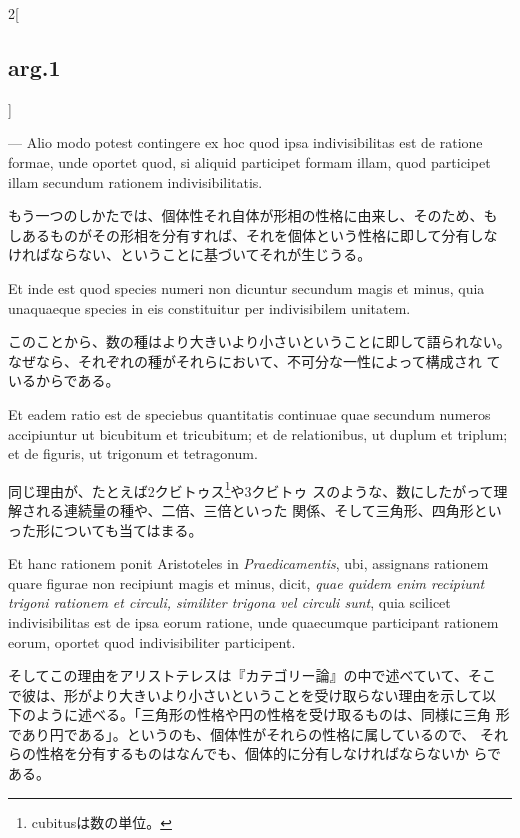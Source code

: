\documentclass[paper=a4paper,fontsize=10pt,jafontsize=9pt,titlepage]{jlreq}
\begin{document}
\begin{paracol}{2}[\subsection{arg.1}]
\switchcolumn*

--- Alio modo potest contingere ex
hoc quod ipsa indivisibilitas est de ratione formae, unde oportet
quod, si aliquid participet formam illam, quod participet illam
secundum rationem indivisibilitatis.

\switchcolumn

もう一つのしかたでは、個体性それ自体が形相の性格に由来し、そのため、も
しあるものがその形相を分有すれば、それを個体という性格に即して分有しな
ければならない、ということに基づいてそれが生じうる。

\switchcolumn*

Et inde est quod species numeri
non dicuntur secundum magis et minus, quia unaquaeque species in eis
constituitur per indivisibilem unitatem.

\switchcolumn

このことから、数の種はより大きいより小さいということに即して語られない。
なぜなら、それぞれの種がそれらにおいて、不可分な一性によって構成され
ているからである。

\switchcolumn*

Et eadem ratio est de
speciebus quantitatis continuae quae secundum numeros accipiuntur ut
bicubitum et tricubitum; et de relationibus, ut duplum et triplum; et
de figuris, ut trigonum et tetragonum.

\switchcolumn

同じ理由が、たとえば2クビトゥス\footnote{cubitusは数の単位。}や3クビトゥ
 スのような、数にしたがって理解される連続量の種や、二倍、三倍といった
 関係、そして三角形、四角形といった形についても当てはまる。

\switchcolumn*

Et hanc rationem ponit
Aristoteles in {\itshape Praedicamentis}, ubi, assignans rationem quare figurae
non recipiunt magis et minus, dicit, {\itshape quae quidem enim recipiunt
trigoni rationem et circuli, similiter trigona vel circuli sunt}, quia
scilicet indivisibilitas est de ipsa eorum ratione, unde quaecumque
participant rationem eorum, oportet quod indivisibiliter
participent.

\switchcolumn

そしてこの理由をアリストテレスは『カテゴリー論』の中で述べていて、そこ
で彼は、形がより大きいより小さいということを受け取らない理由を示して以
下のように述べる。「三角形の性格や円の性格を受け取るものは、同様に三角
形であり円である」。というのも、個体性がそれらの性格に属しているので、
それらの性格を分有するものはなんでも、個体的に分有しなければならないか
らである。


\end{paracol}
\end{document}
